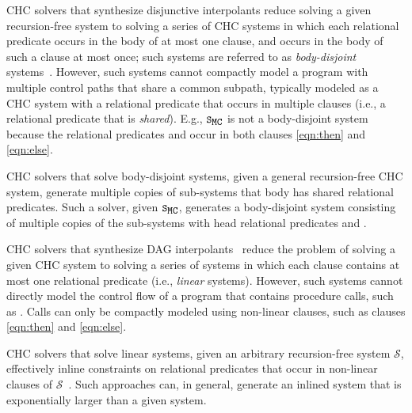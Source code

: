 CHC solvers that synthesize disjunctive interpolants reduce solving a
given recursion-free system to solving a series of CHC systems in
which each relational predicate occurs in the body of at most one
clause, and occurs in the body of such a clause at most once;
%
such systems are referred to as \emph{body-disjoint}
systems~\cite{rummer13a,rummer13b}.
%
However, such systems cannot compactly model a program with multiple
control paths that share a common subpath, typically modeled as a CHC
system with a relational predicate that occurs in multiple clauses
(i.e., a relational predicate that is \emph{shared}).
%
E.g., $\mcchc$ is not a body-disjoint system because the relational
predicates  and  occur in both clauses
\autoref{eqn:then} and \autoref{eqn:else}.

CHC solvers that solve body-disjoint systems, given a general recursion-free CHC system,
generate multiple copies of sub-systems that body has shared
relational predicates.
%
Such a solver, given $\mcchc$, generates a body-disjoint system
consisting of multiple copies of the sub-systems with head relational
predicates  and .

CHC solvers that synthesize DAG interpolants~\cite{albarghouthi12a}
reduce the problem of solving a given CHC system to solving a series
of systems in which each clause contains at most one relational
predicate (i.e., \emph{linear} systems).
%
However, such systems cannot directly model the control flow of a
program that contains procedure calls, such as .
%
Calls can only be compactly modeled using non-linear clauses, such as
clauses \autoref{eqn:then} and \autoref{eqn:else}.

CHC solvers that solve linear systems, given an arbitrary
recursion-free system $\mathcal{S}$, effectively inline constraints on
relational predicates that occur in non-linear clauses of
$\mathcal{S}$~\cite{albarghouthi12b}.
%
Such approaches can, in general, generate an inlined system that is
exponentially larger than a given system.

